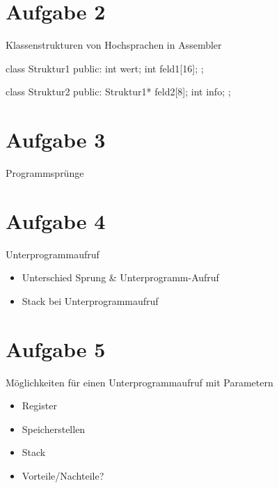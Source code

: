 \documentclass[
  german,            %
  aspectratio=169,    %
  sectionpage=false,   %
]{tumbeamer}
\begin{document}
\section{Aufgabe 2}
\begin{frame}[fragile]{Klassenstrukturen von Hochsprachen in Assembler}
    \begin{semiverbatim}
        class Struktur1{
        public:
            int wert;
            int feld1[16];
        };

        class Struktur2{
        public:
            Struktur1* feld2[8];
            int info;
        };
    \end{semiverbatim}                
\end{frame}
\section{Aufgabe 3}
\begin{frame}{Programmsprünge}
\end{frame}
\section{Aufgabe 4}
\begin{frame}{Unterprogrammaufruf}
    \begin{itemize}
        \item Unterschied Sprung \& Unterprogramm-Aufruf
        \item Stack bei Unterprogrammaufruf
    \end{itemize}
\end{frame}
\section{Aufgabe 5}
\begin{frame}{Möglichkeiten für einen Unterprogrammaufruf mit Parametern}
    \begin{itemize}
        \item Register
        \item Speicherstellen
        \item Stack
        \item Vorteile/Nachteile?
     \end{itemize}
\end{frame}
\end{document}
